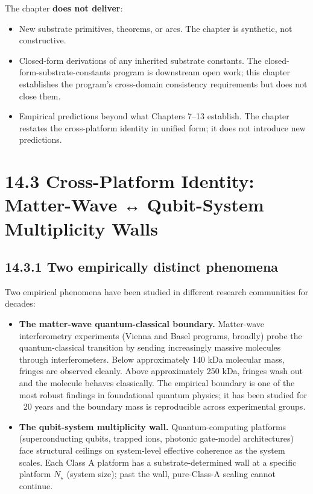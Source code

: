 \documentclass[11pt]{book}
\begin{document}
The chapter \textbf{does not deliver}:
\begin{itemize}
\item New substrate primitives, theorems, or arcs. The chapter is synthetic, not constructive.
\item Closed-form derivations of any inherited substrate constants. The closed-form-substrate-constants program is downstream open work; this chapter establishes the program's cross-domain consistency requirements but does not close them.
\item Empirical predictions beyond what Chapters 7–13 establish. The chapter restates the cross-platform identity in unified form; it does not introduce new predictions.
\end{itemize}

\section{14.3 Cross-Platform Identity: Matter-Wave ↔ Qubit-System Multiplicity Walls}

\subsection{14.3.1 Two empirically distinct phenomena}

Two empirical phenomena have been studied in different research communities for decades:

\begin{itemize}
\item \textbf{The matter-wave quantum-classical boundary.} Matter-wave interferometry experiments (Vienna and Basel programs, broadly) probe the quantum-classical transition by sending increasingly massive molecules through interferometers. Below approximately 140 kDa molecular mass, fringes are observed cleanly. Above approximately 250 kDa, fringes wash out and the molecule behaves classically. The empirical boundary is one of the most robust findings in foundational quantum physics; it has been studied for ~20 years and the boundary mass is reproducible across experimental groups.
\item \textbf{The qubit-system multiplicity wall.} Quantum-computing platforms (superconducting qubits, trapped ions, photonic gate-model architectures) face structural ceilings on system-level effective coherence as the system scales. Each Class A platform has a substrate-determined wall at a specific platform $N_\star$ (system size); past the wall, pure-Class-A scaling cannot continue.
\end{itemize}
\end{document}
